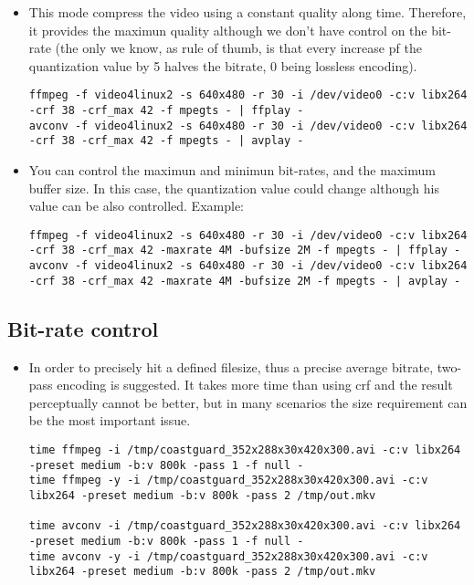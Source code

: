 \begin{itemize}

\item This mode compress the video using a constant quality along
  time. Therefore, it provides the maximun quality although we don't
  have control on the bit-rate (the only we know, as rule of thumb, is
  that every increase pf the quantization value by 5 halves the
  bitrate, 0 being lossless encoding).

\begin{verbatim}
ffmpeg -f video4linux2 -s 640x480 -r 30 -i /dev/video0 -c:v libx264 -crf 38 -crf_max 42 -f mpegts - | ffplay -
avconv -f video4linux2 -s 640x480 -r 30 -i /dev/video0 -c:v libx264 -crf 38 -crf_max 42 -f mpegts - | avplay -
\end{verbatim}

\item You can control the maximun and minimun bit-rates, and the
  maximum buffer size. In this case, the quantization value could
  change although his value can be also controlled. Example:

\begin{verbatim}
ffmpeg -f video4linux2 -s 640x480 -r 30 -i /dev/video0 -c:v libx264 -crf 38 -crf_max 42 -maxrate 4M -bufsize 2M -f mpegts - | ffplay -
avconv -f video4linux2 -s 640x480 -r 30 -i /dev/video0 -c:v libx264 -crf 38 -crf_max 42 -maxrate 4M -bufsize 2M -f mpegts - | avplay -
\end{verbatim}

\end{itemize}


\subsection{Bit-rate control}

\begin{itemize}

\item In order to precisely hit a defined filesize, thus a precise
  average bitrate, two-pass encoding is suggested. It takes more time
  than using crf and the result perceptually cannot be better, but in
  many scenarios the size requirement can be the most important issue.

\begin{verbatim}
time ffmpeg -i /tmp/coastguard_352x288x30x420x300.avi -c:v libx264 -preset medium -b:v 800k -pass 1 -f null -
time ffmpeg -y -i /tmp/coastguard_352x288x30x420x300.avi -c:v libx264 -preset medium -b:v 800k -pass 2 /tmp/out.mkv

time avconv -i /tmp/coastguard_352x288x30x420x300.avi -c:v libx264 -preset medium -b:v 800k -pass 1 -f null -
time avconv -y -i /tmp/coastguard_352x288x30x420x300.avi -c:v libx264 -preset medium -b:v 800k -pass 2 /tmp/out.mkv
\end{verbatim}

\end{itemize}


